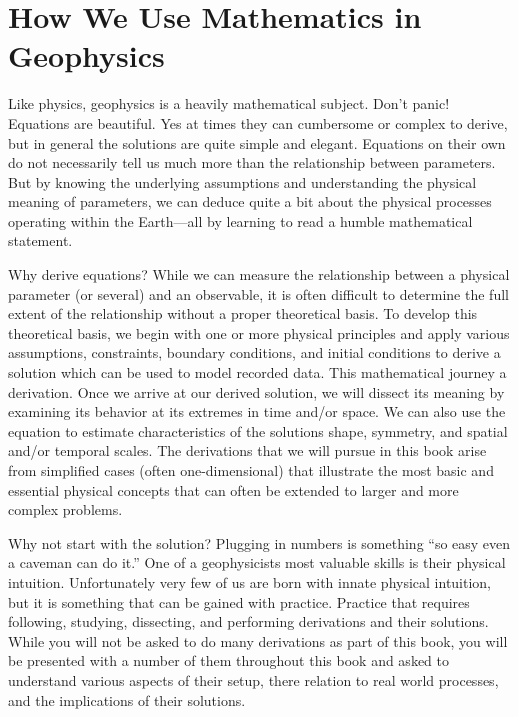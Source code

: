 \section*{How We Use Mathematics in Geophysics}
Like physics, geophysics is a heavily mathematical subject.  Don't panic!  Equations are beautiful.  Yes at times they can cumbersome or complex to derive, but in general the solutions are quite simple and elegant.  Equations on their own do not necessarily tell us much more than the relationship between parameters.  But by knowing the underlying assumptions and understanding the physical meaning of parameters, we can deduce quite a bit about the physical processes operating within the Earth---all by learning to read a humble mathematical statement.

Why derive equations?  While we can measure the relationship between a physical parameter (or several) and an observable, it is often difficult to determine the full extent of the relationship without a proper theoretical basis.  To develop this theoretical basis, we begin with one or more physical principles and apply various assumptions, constraints, boundary conditions, and initial conditions to derive a solution which can be used to model recorded data.  This mathematical journey a derivation.  Once we arrive at our derived solution, we will dissect its meaning by examining its behavior at its extremes in time and/or space.  We can also use the equation to estimate characteristics of the solutions shape, symmetry, and spatial and/or temporal scales.  The derivations that we will pursue in this book arise from simplified cases (often one-dimensional) that illustrate the most basic and essential physical concepts that can often be extended to larger and more complex problems.

Why not start with the solution?  Plugging in numbers is something ``so easy even a caveman can do it.''  One of a geophysicists most valuable skills is their physical intuition.  Unfortunately very few of us are born with innate physical intuition, but it is something that can be gained with practice.  Practice that requires following, studying, dissecting, and performing derivations and their solutions.  While you will not be asked to do many derivations as part of this book, you will be presented with a number of them throughout this book and asked to understand various aspects of their setup, there relation to real world processes, and the implications of their solutions.

